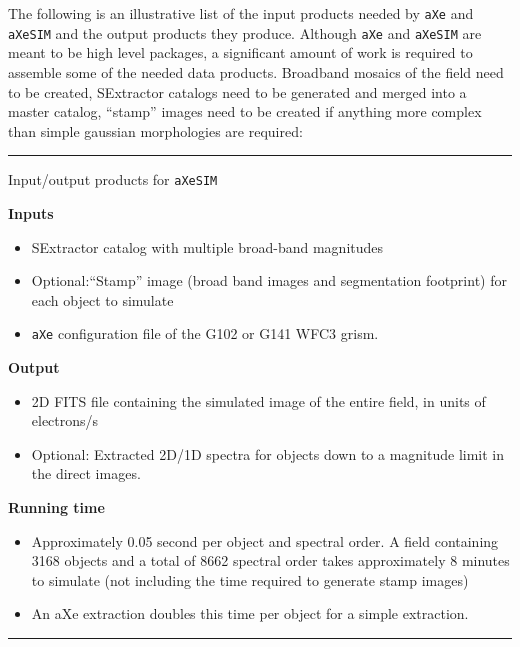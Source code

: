 \documentclass[12pt]{article}
\begin{document}
The following is an illustrative list of the input products needed by \texttt{aXe} and \texttt{aXeSIM} and the output products they produce. Although \texttt{aXe} and \texttt{aXeSIM} are meant to be high level packages, a significant amount of work is required to assemble some of the needed data products. Broadband mosaics of the field need to be created, SExtractor catalogs need to be generated and merged into a master catalog, ``stamp'' images need to be created if anything more complex than simple gaussian morphologies are required:

\noindent\hfil\rule{0.5\textwidth}{.4pt}\hfil

\centerline{Input/output products for \texttt{aXeSIM}}
\noindent \textbf{Inputs}
\begin{itemize}
\item SExtractor catalog with multiple broad-band magnitudes
\item Optional:``Stamp'' image (broad band images and segmentation footprint) for each object to simulate 
\item \texttt{aXe} configuration file of the G102 or G141 WFC3 grism.
\end{itemize}
\noindent \textbf{Output}
\begin{itemize}
\item 2D FITS file containing the simulated image of the entire field, in units of electrons/s 
\item Optional: Extracted 2D/1D spectra for objects down to a magnitude limit in the direct images.
\end{itemize}

\noindent \textbf{Running time}
\begin{itemize}
\item Approximately 0.05 second per object and spectral order. A field containing 3168 objects and a total of 8662 spectral order takes approximately 8 minutes to simulate (not including the time required to generate stamp images)
\item An aXe extraction doubles this time per object for a simple extraction.
\end{itemize}

\newpage

\noindent\hfil\rule{0.5\textwidth}{.4pt}\hfil
\end{document}
